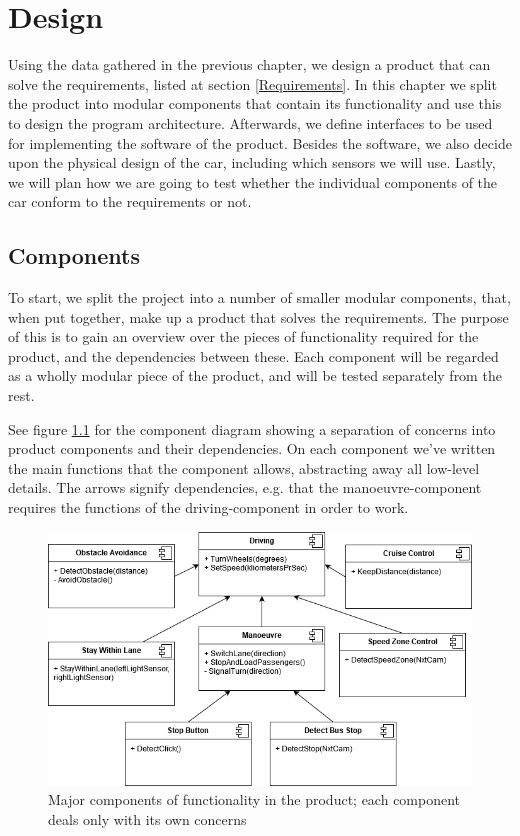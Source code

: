 \chapter{Design}
Using the data gathered in the previous chapter, we design a product that can solve the requirements, listed at section \ref{Requirements}. In this chapter we split the product into modular components that contain its functionality and use this to design the program architecture. Afterwards, we define interfaces to be used for implementing the software of the product. Besides the software, we also decide upon the physical design of the car, including which sensors we will use. Lastly, we will plan how we are going to test whether the individual components of the car conform to the requirements or not.

\section{Components}

To start, we split the project into a number of smaller modular components, that, when put together, make up a product that solves the requirements. The purpose of this is to gain an overview over the pieces of functionality required for the product, and the dependencies between these. Each component will be regarded as a wholly modular piece of the product, and will be tested separately from the rest. 


See figure \ref{fig:components} for the component diagram showing a separation of concerns into product components and their dependencies. On each component we've written the main functions that the component allows, abstracting away all low-level details. The arrows signify dependencies, e.g. that the manoeuvre-component requires the functions of the driving-component in order to work. 

\begin{figure}[ht]
    \includegraphics[width=\textwidth]{Images/Design/componentDiagram.png}
    \caption{Major components of functionality in the product; each component deals only with its own concerns}
    \label{fig:components}
\end{figure}

